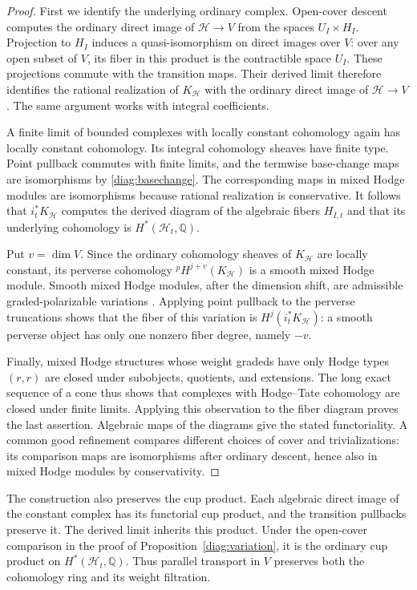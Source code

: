 \begin{proof}
 First we identify the underlying ordinary complex.  Open-cover
 descent computes the ordinary direct image of $\mathscr H\to V$
 from the spaces $U_I\times H_I$.  Projection to $H_I$ induces a
 quasi-isomorphism on direct images over $V$: over any open subset
 of $V$, its fiber in this product is the contractible space $U_I$.
 These projections commute with the transition maps.  Their derived
 limit therefore identifies the rational realization of
 $K_{\mathscr H}$ with the ordinary direct image of $\mathscr H\to V$.
 The same argument works with integral coefficients.

 A finite limit of bounded complexes with locally constant cohomology
 again has locally constant cohomology.  Its integral cohomology
 sheaves have finite type.  Point pullback commutes with finite limits,
 and the termwise base-change maps are isomorphisms by
 \eqref{diag:basechange}.  The corresponding maps in mixed Hodge
 modules are isomorphisms because rational realization is conservative.
 It follows that $i_t^*K_{\mathscr H}$ computes the derived diagram of
 the algebraic fibers $H_{I,t}$ and that its underlying cohomology is
 $H^*(\mathscr H_t,\mathbb Q)$.

 Put $v=\dim V$.  Since the ordinary cohomology sheaves of
 $K_{\mathscr H}$ are locally constant, its perverse cohomology
 ${}^pH^{j+v}(K_{\mathscr H})$ is a smooth mixed Hodge module.
 Smooth mixed Hodge modules, after the dimension shift, are admissible
 graded-polarizable variations
 \cite[Section~3.2, Equation~(3.2.1)]{SaitoExtension1990}.
 Applying point pullback to the perverse truncations shows that the
 fiber of this variation is $H^j(i_t^*K_{\mathscr H})$: a smooth
 perverse object has only one nonzero fiber degree, namely $-v$.

 Finally, mixed Hodge structures whose weight gradeds have only Hodge
 types $(r,r)$ are closed under subobjects, quotients, and extensions.
 The long exact sequence of a cone thus shows that complexes with
 Hodge--Tate cohomology are closed under finite limits.  Applying this
 observation to the fiber diagram proves the last assertion.
 Algebraic maps of the diagrams give the stated functoriality.
 A common good refinement compares different choices of cover and
 trivializations: its comparison maps are isomorphisms after ordinary
 descent, hence also in mixed Hodge modules by conservativity.
\end{proof}

The construction also preserves the cup product.  Each algebraic
direct image of the constant complex has its functorial cup product,
and the transition pullbacks preserve it.  The derived limit inherits
this product.  Under the open-cover comparison in the proof of
Proposition~\ref{diag:variation}, it is the ordinary cup product on
$H^*(\mathscr H_t,\mathbb Q)$.  Thus parallel transport in $V$ preserves
both the cohomology ring and its weight filtration.

